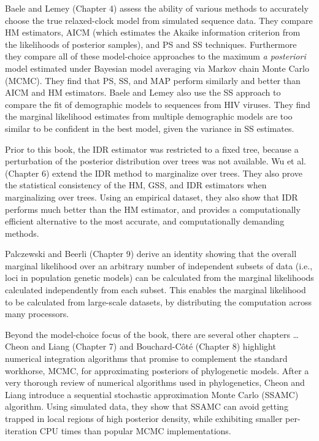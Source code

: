 \documentclass[letterpaper,12pt]{article}
\begin{document}
Baele and Lemey (Chapter 4) assess the ability of various methods to accurately
choose the true relaxed-clock model from simulated sequence data.
They compare HM estimators, AICM (which estimates the Akaike information criterion
from the likelihoods of posterior samples), and PS and SS techniques.
Furthermore they compare all of these model-choice approaches to the maximum
\emph{a posteriori} model estimated under Bayesian model averaging via Markov
chain Monte Carlo (MCMC).
They find that PS, SS, and MAP perform similarly and better than AICM
and HM estimators.
Baele and Lemey also use the SS approach to compare the fit of demographic
models to sequences from HIV viruses.
They find the marginal likelihood estimates from multiple demographic models
are too similar to be confident in the best model, given the variance in SS
estimates.

Prior to this book,
the IDR estimator was restricted to a fixed tree, because a perturbation of the
posterior distribution over trees was not available.
Wu et al. (Chapter 6) extend the IDR method to marginalize over trees.
They also prove the statistical consistency of the HM, GSS, and IDR estimators
when marginalizing over trees.
Using an empirical dataset, they also show that IDR performs much better than
the HM estimator, and provides a computationally efficient alternative to the
most accurate, and computationally demanding methods.

Palczewski and Beerli (Chapter 9) derive an identity showing that the overall
marginal likelihood over an arbitrary number of independent subsets of 
data (i.e., loci in population genetic models) can be calculated from
the marginal likelihoods calculated independently from each subset. 
This enables the marginal likelihood to be calculated from large-scale
datasets, by distributing the computation across many processors.

Beyond the model-choice focus of the book, there are several other chapters \ldots
Cheon and Liang (Chapter 7) and Bouchard-C\^{o}t\'{e} (Chapter 8) highlight numerical
integration algorithms that promise to complement the standard workhorse, MCMC,
for approximating posteriors of phylogenetic models.
After a very thorough review of numerical algorithms used in phylogenetics,
Cheon and Liang introduce a sequential stochastic approximation Monte Carlo (SSAMC) \citep{Liang2007,Cheon2008}
algorithm.
Using simulated data, they show that SSAMC can avoid getting trapped in local
regions of high posterior density, while exhibiting smaller per-iteration CPU
times than popular MCMC implementations.
\end{document}
